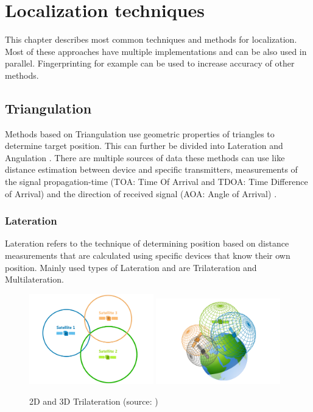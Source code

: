 \chapter{Localization techniques}\label{sec:LocalizationTechniques}
This chapter describes most common techniques and methods for localization. Most of these approaches have multiple implementations and can be also used in parallel. Fingerprinting for example can be used to increase accuracy of other methods.

\section{Triangulation}\label{sec:Triangulation}
Methods based on Triangulation use geometric properties of triangles to determine target position. This can further be divided into Lateration and Angulation \cite{RAinWILTaS}. There are multiple sources of data these methods can use like distance estimation between device and specific transmitters, measurements of the signal propagation-time (TOA: Time Of Arrival and TDOA: Time Difference of Arrival\cite{LTinWSN}) and the direction of received
signal (AOA: Angle of Arrival\cite{AoALforWSN}) \cite{IILUBLEB}.

\subsection{Lateration}\label{sec:Lateration}
Lateration refers to the technique of determining position based on distance measurements that are calculated using specific devices that know their own position.  Mainly used types of Lateration and are Trilateration and Multilateration. 

\begin{figure}[h!]
	\begin{centering}
		\includegraphics[width=0.48\textwidth]{img/trilateration_2d}
		\includegraphics[width=0.48\textwidth]{img/trilateration_3d}
		\par\end{centering}
	\caption{2D and 3D Trilateration (source: \cite{TvTHGPSRW})\label{fig:2d_and_3d_trilateration}}
	\label{fig2}
\end{figure}

